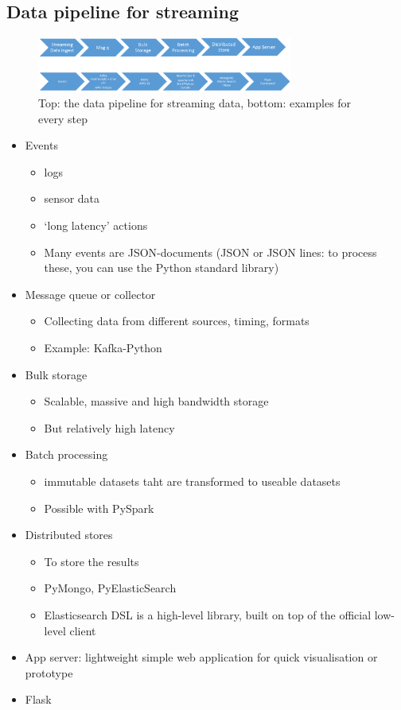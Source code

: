\documentclass{article}
\begin{document}
\subsection{Data pipeline for streaming}

\begin{figure}[H]
    \centering
    \includegraphics[width=0.75\textwidth]{datapipelines-streaming.png}
    \caption{Top: the data pipeline for streaming data, bottom: examples for every step}
\end{figure}

\begin{itemize}
    \item Events
    \begin{itemize}
        \item logs
        \item sensor data
        \item `long latency' actions
        \item Many events are JSON-documents (JSON or JSON lines: to process these, you can use the Python standard library)
    \end{itemize}
    \item Message queue or collector
    \begin{itemize}
        \item Collecting data from different sources, timing, formats
        \item Example: Kafka-Python
    \end{itemize}
    \item Bulk storage
    \begin{itemize}
        \item Scalable, massive and high bandwidth storage
        \item But relatively high latency
    \end{itemize}
    \item Batch processing
    \begin{itemize}
        \item immutable datasets taht are transformed to useable datasets
        \item Possible with PySpark
    \end{itemize}
    \item Distributed stores
    \begin{itemize}
        \item To store the results
        \item PyMongo, PyElasticSearch
        \item Elasticsearch DSL is a high-level library, built on top of the official low-level client
    \end{itemize}
    \item App server: lightweight simple web application for quick visualisation or prototype
    \item Flask
\end{itemize}
\end{document}

